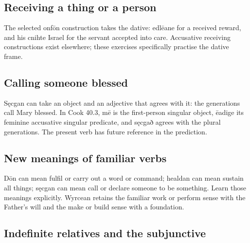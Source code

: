\subsection*{Receiving a thing or a person}

The selected onfōn construction takes the dative: edlēane for a received reward, and his cnihte Israel for the servant accepted into care. Accusative receiving constructions exist elsewhere; these exercises specifically practise the dative frame.

\subsection*{Calling someone blessed}

Sęcgan can take an object and an adjective that agrees with it: the generations call Mary blessed. In Cook 40.3, mē is the first-person singular object, ēadige its feminine accusative singular predicate, and sęcgað agrees with the plural generations. The present verb has future reference in the prediction.

\subsection*{New meanings of familiar verbs}

Dōn can mean fulfil or carry out a word or command; healdan can mean sustain all things; sęcgan can mean call or declare someone to be something. Learn those meanings explicitly. Wyrcean retains the familiar work or perform sense with the Father’s will and the make or build sense with a foundation.

\subsection*{Indefinite relatives and the subjunctive}

